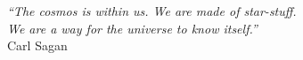 \cleardoublepage
\thispagestyle{plain}

\vspace*{8cm}

\begin{flushright}
   \textsl{``The cosmos is within us. We are made of star-stuff. \\ We are a way for the universe to know itself.''} \\
\vspace*{1.5cm}
    Carl Sagan
\end{flushright}
